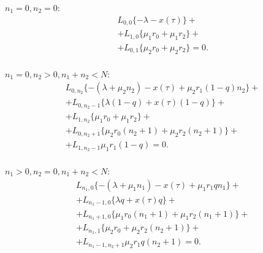$n_{1}=0, n_{2}=0$:\\
\begin{equation}\label{rEquationLong0}
	\begin{split}
		&L_{0, 0}\{-\lambda - x(\tau)\}+\\
		&+L_{1 , 0}\{\mu_{1} r_{0}+ \mu_{1} r_{2}\}+\\
		&+L_{0, 1 }\{ \mu_{2} r_{0}  + \mu_{2} r_{2}\}=0.\\
	\end{split}
\end{equation}

$n_{1}=0, n_{2} > 0, n_{1}+n_{2}< N$:\\
\begin{equation}\label{rEquationLong1}
	\begin{split}
		&L_{0, n_{2}}\{-(\lambda+\mu_{2}n_{2}) - x(\tau)+  \mu_{2}r_{1}(1-q)n_{2}\}+\\
		&+L_{0, n_{2}-1}\{\lambda (1-q) + x(\tau) (1-q) \}+\\
		&+L_{1 , n_{2}}\{\mu_{1} r_{0} + \mu_{1} r_{2} \}+\\
		&+L_{0, n_{2} + 1 }\{ \mu_{2} r_{0} (n_{2}+1) + \mu_{2} r_{2} (n_{2}+1)\}+\\
		&+L_{1 , n_{2}-1}\mu_{1} r_{1}(1-q) =0.\\
	\end{split}
\end{equation}

$n_{1}>0, n_{2} = 0, n_{1}+n_{2}< N$:\\
\begin{equation}\label{rEquationLong2}
	\begin{split}
		&L_{n_{1},0}\{-(\lambda+\mu_{1}n_{1}) - x(\tau) + \mu_{1}r_{1}qn_{1}\}+\\
		&+L_{n_{1}-1, 0}\{\lambda q+ x(\tau) q  \}+\\
		&+L_{n_{1} +1 , 0}\{ \mu_{1} r_{0}(n_{1}+1) + \mu_{1} r_{2} (n_{1}+1)\}+\\
		&+L_{n_{1}, 1 }\{ \mu_{2} r_{0}  + \mu_{2} r_{2} (n_{2}+1)\}+\\
		&+L_{n_{1} -1 , n_{2}+1}\mu_{2} r_{1}q(n_{2}+1) =0.
	\end{split}
\end{equation}

